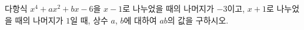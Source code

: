 다항식 $x^4+ax^2+bx-6$을 $x-1$로 나누었을 때의 나머지가 $-3$이고, $x+1$로 나누었을 때의 나머지가 $1$일 때, 상수 $a$, $b$에 대하여 $ab$의 값을 구하시오.
